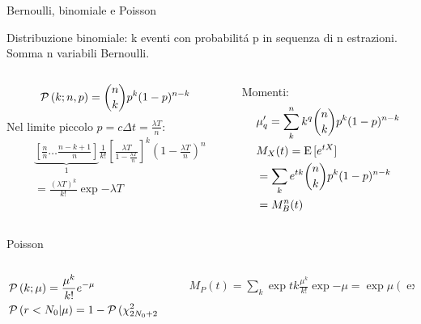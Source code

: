 \begin{frame}{Bernoulli, binomiale e Poisson}
\begin{block}{Distribuzione binomiale: k eventi con probabilit\'a p in sequenza di n estrazioni. Somma n variabili Bernoulli.}
\begin{columns}[T]
\begin{column}{0.5\textwidth}
\[\operatorname{\mathcal{P}}{(k;n,p)}=\binom{n}{k}p^k(1-p)^{n-k}\]
Nel limite piccolo $p=c\Delta t=\frac{\lambda T}{n}$:
\begin{align*}
&\underbrace{[\frac{n}{n}\ldots\frac{n-k+1}{n}]}_{1}\frac{1}{k!}[\frac{\lambda T}{1-\frac{\lambda T}{n}}]^k(1-\frac{\lambda T}{n})^n\\
&=\frac{(\lambda T)^k}{k!}\exp{-\lambda T}
\end{align*}
\end{column}
\begin{column}{0.5\textwidth}
Momenti:
\begin{align*}
&\mu'_q=\sum_k^nk^q\binom{n}{k}p^k(1-p)^{n-k}\\
&M_X(t)=\operatorname{E}{[e^{tX}]}\\
&=\sum_ke^{tk}\binom{n}{k}p^k(1-p)^{n-k}\\
&=M_B^n(t)
\end{align*}
\end{column}
\end{columns}
\end{block}
\begin{block}{Poisson}
\begin{columns}[T]
\begin{column}{0.5\textwidth}
\begin{align*}
&\operatorname{\mathcal{P}}{(k;\mu)}=\frac{\mu^k}{k!}e^{-\mu}\\
&\operatorname{\mathcal{P}}{(r<N_0|\mu)}=1-\operatorname{\mathcal{P}}{(\chi^2_{2N_0+2}<2\mu)}
\end{align*}
\end{column}
\begin{column}{0.5\textwidth}
\begin{align*}
&M_P(t)=\sum_k\exp{tk}\frac{\mu^k}{k!}\exp{-\mu}=\exp{\mu(\exp{t}-1)}
\end{align*}
\end{column}
\end{columns}
\end{block}
\end{frame}

